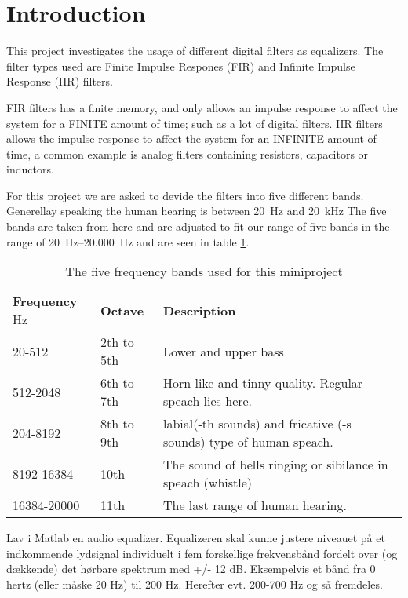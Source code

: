 \section{Introduction}
This project investigates the usage of different digital filters as equalizers. The filter types used are Finite Impulse Respones (FIR) and Infinite Impulse Response (IIR) filters.

FIR filters has a finite memory, and only allows an impulse response to affect the system for a FINITE amount of time; such as a lot of digital filters. IIR filters allows the impulse response to affect the system for an INFINITE amount of time, a common example is analog filters containing resistors, capacitors or inductors.

For this project we are asked to devide the filters into five different bands. Generellay speaking the human hearing is between \SI{20}{\hertz} and \SI{20}{\kilo\hertz} The five bands are taken from \href{https://en.wikipedia.org/wiki/Audio_frequency}{here} and are adjusted to fit our range of five bands in the range of \SIrange{20}{20.000}{\hertz} and are seen in table \ref{tab:FiveBand}.

\begin{table}[b]
	\caption{The five frequency bands used for this miniproject}
	\label{tab:FiveBand}
	\begin{tabularx}{\textwidth}{X X X}
		\textbf{Frequency} \si{\hertz} & \textbf{Octave} & \textbf{Description} \\
		20-512 & 2th to 5th & Lower and upper bass \\
		512-2048 & 6th to 7th & Horn like and tinny quality. Regular speach lies here. \\
		204-8192 & 8th to 9th & labial(-th sounds) and fricative (-s sounds) type of human speach.\\
		8192-16384 & 10th & The sound of bells ringing or sibilance in speach (whistle)\\
		16384-20000 & 11th & The last range of human hearing. \\
	\end{tabularx}	
\end{table}




Lav i Matlab en audio equalizer. Equalizeren skal kunne justere niveauet på et indkommende lydsignal individuelt i fem forskellige frekvensbånd fordelt over (og dækkende) det hørbare spektrum med +/- 12 dB. Eksempelvis et bånd fra 0 hertz (eller måske 20 Hz) til 200 Hz. Herefter evt. 200-700 Hz og så fremdeles.

